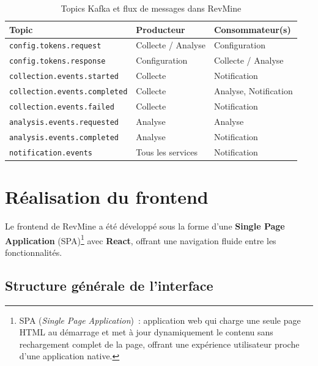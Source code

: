 \begin{table}[H]
\centering
\small
\caption{Topics Kafka et flux de messages dans RevMine}
\label{tab:kafka-topics}
\begin{tabular}{|>{\raggedright\arraybackslash}p{6.2cm}
                |>{\raggedright\arraybackslash}p{3cm}
                |>{\raggedright\arraybackslash}p{3.5cm}|}
\hline
\textbf{Topic} & \textbf{Producteur} & \textbf{Consommateur(s)} \\
\hline
\texttt{config.tokens.request} & Collecte / Analyse & Configuration \\
\hline
\texttt{config.tokens.response} & Configuration & Collecte / Analyse \\
\hline
\texttt{collection.events.started} & Collecte & Notification \\
\hline
\texttt{collection.events.completed} & Collecte & Analyse, Notification \\
\hline
\texttt{collection.events.failed} & Collecte & Notification \\
\hline
\texttt{analysis.events.requested} & Analyse & Analyse \\
\hline
\texttt{analysis.events.completed} & Analyse & Notification \\
\hline
\texttt{notification.events} & Tous les services & Notification \\
\hline
\end{tabular}
\end{table}

\section{Réalisation du frontend}

Le frontend de RevMine a été développé sous la forme d'une \textbf{Single Page Application}
(SPA)\footnote{SPA (\textit{Single Page Application})~: application web qui charge une seule
page HTML au démarrage et met à jour dynamiquement le contenu sans rechargement complet de la
page, offrant une expérience utilisateur proche d'une application native.} avec \textbf{React},
offrant une navigation fluide entre les fonctionnalités.

\subsection{Structure générale de l'interface}

